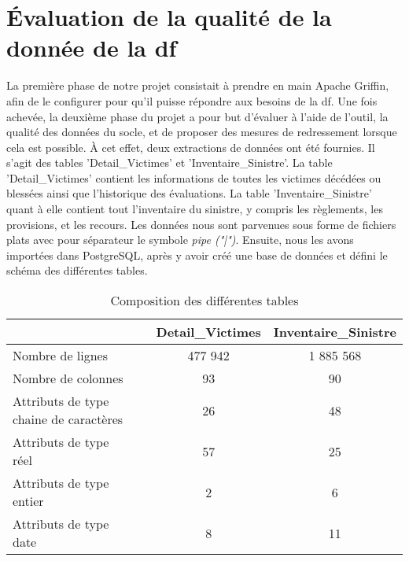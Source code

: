 \section{Évaluation de la qualité de la donnée de la \acrlong{df}}
La premi\`ere phase de notre projet consistait \`a prendre en main Apache Griffin, afin de le configurer pour qu'il puisse r\'epondre aux besoins de la \acrshort{df}. Une fois achev\'ee,  la deuxi\`eme phase du projet a pour but d'\'evaluer \`a l'aide de l'outil, la qualit\'e des donn\'ees du socle, et de proposer des mesures de redressement lorsque cela est possible. \`A cet effet, deux extractions de donn\'ees ont \'et\'e fournies. Il s'agit des tables 'Detail\_Victimes' et 'Inventaire\_Sinistre'. La table 'Detail\_Victimes' contient les informations de toutes les victimes décédées ou blessées ainsi que l'historique des évaluations. La table 'Inventaire\_Sinistre' quant \`a elle contient tout l'inventaire du sinistre, y compris les règlements, les provisions, et les recours. Les donn\'ees nous sont parvenues sous forme de fichiers plats avec pour s\'eparateur le symbole \textit{pipe ("|")}. Ensuite, nous les avons import\'ees dans PostgreSQL, apr\`es y avoir cr\'e\'e une base de donn\'ees et d\'efini le sch\'ema des diff\'erentes tables. 
\begin{table}[H]
\caption{Composition des diff\'erentes tables}
\vspace{0.5cm}
\begin{tabular}{llcc}
\toprule 
&& Detail\_Victimes & Inventaire\_Sinistre \\
\midrule
Nombre de lignes && 477 942 & 1 885 568 \\ 
Nombre de colonnes && 93 & 90 \\
Attributs de type chaine de caract\`eres && 26 & 48 \\
Attributs de type r\'eel && 57 & 25 \\
Attributs de type entier && 2 & 6 \\
Attributs de type date && 8 & 11 \\
\bottomrule
\end{tabular}
\end{table}

